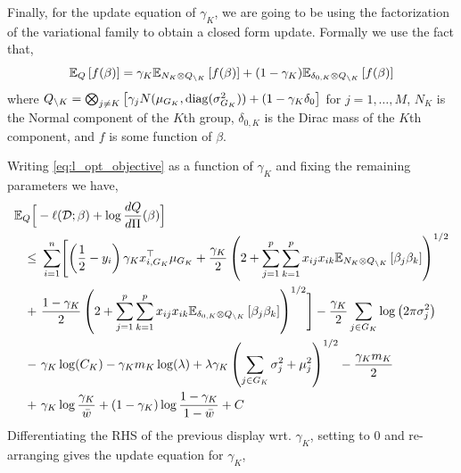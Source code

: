 \documentclass[12pt]{article}
\begin{document}
Finally, for the update equation of $\gamma_K$, we are going to be using the factorization of the variational family to obtain a closed form update. Formally we use the fact that,
\begin{equation}
    \mathbb{E}_Q \left[ f(\beta) \right] = 
	\gamma_K \mathbb{E}_{N_K \otimes Q_{\backslash K}} \left[ f(\beta) \right] +
	(1-\gamma_K) \mathbb{E}_{\delta_{0, K} \otimes Q_{\backslash K}} \left[ f(\beta) \right]
\end{equation}
where $Q_{\backslash K} = \bigotimes_{j \neq K} \left[ \gamma_j N(\mu_{G_K}, \operatorname{diag}(\sigma_{G_K}^2)) + (1-\gamma_K \delta_0 \right]$ for $j=1,\dots,M$, $N_K$ is the Normal component of the $K$th group, $\delta_{0, K}$ is the Dirac mass of the $K$th component, and $f$ is some function of $\beta$.

Writing \eqref{eq:l_opt_objective} as a function of $\gamma_K$ and fixing the remaining parameters we have,
\begin{equation} \label{eq:l_gamma_up} 
\begin{aligned}
    \mathbb{E}_{Q}  \Big[ &
	-  \ell(\mathcal{D}; \beta) + \log \frac{dQ}{d\Pi}(\beta) 
    \Big]  \\
\leq &\
    \sum_{i=1}^n \Biggl[
	\left( \frac{1}{2} - y_i \right) \gamma_K x_{i, G_K}^\top \mu_{G_K} 
	+
	\frac{\gamma_K}{2} \left( 2 + \sum_{j=1}^p \sum_{k=1}^p x_{ij} x_{ik} 
	\mathbb{E}_{N_K \otimes Q_{\backslash K}} \left[ \beta_j \beta_k \right] \right)^{1/2}  \\
	+&\
	\frac{1 - \gamma_K}{2} \left( 2 + \sum_{j=1}^p \sum_{k=1}^p x_{ij} x_{ik} 
	\mathbb{E}_{\delta_{0,K} \otimes Q_{\backslash K}} \left[ \beta_j \beta_k \right] \right)^{1/2} 
    \Biggr]
-
    \frac{\gamma_K}{2} \sum_{j \in G_K} \log \left( 2 \pi \sigma_j^2 \right)  \\
- &\
    \gamma_K \log(C_K )
-
    \gamma_K m_K \log (\lambda) 
+
    \lambda \gamma_K \left( \sum_{j \in G_K} 
	\sigma_j^2 + \mu_j^2
    \right)^{1/2}
-
    \frac{\gamma_K m_K}{2}  \\
+ &\
    \gamma_K \log \frac{\gamma_K}{\bar{w}}
+ 
    (1 - \gamma_K) \log \frac{1 - \gamma_K}{1 - \bar{w}}
+ C
\end{aligned}
\end{equation}
Differentiating the RHS of the previous display wrt. $\gamma_K$, setting to $0$ and re-arranging gives the update equation for $\gamma_K$,
\end{document}
